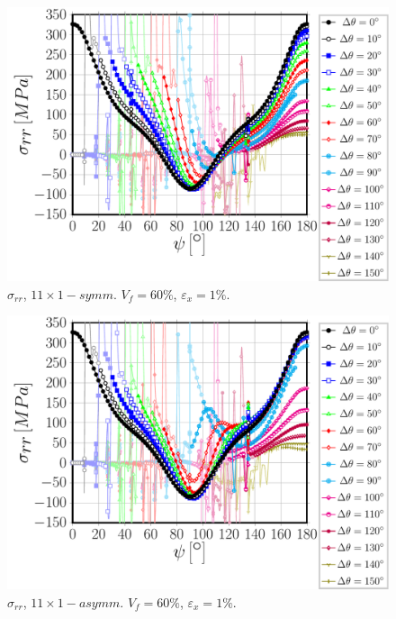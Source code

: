 \documentclass[review]{elsarticle}
\begin{document}
\begin{figure}[!h]
\centering
\includegraphics[width=\textwidth]{S5A0vk-circum-sigmar.pdf}
\caption{$\sigma_{rr}$, $11\times 1-symm$. $V_{f}=60\%$, $\varepsilon_{x}=1\%$.}\label{}
\end{figure}

\begin{figure}[!h]
\centering
\includegraphics[width=\textwidth]{S5A0asymm-circum-sigmar.pdf}
\caption{$\sigma_{rr}$, $11\times 1-asymm$. $V_{f}=60\%$, $\varepsilon_{x}=1\%$.}\label{}
\end{figure}
\end{document}
